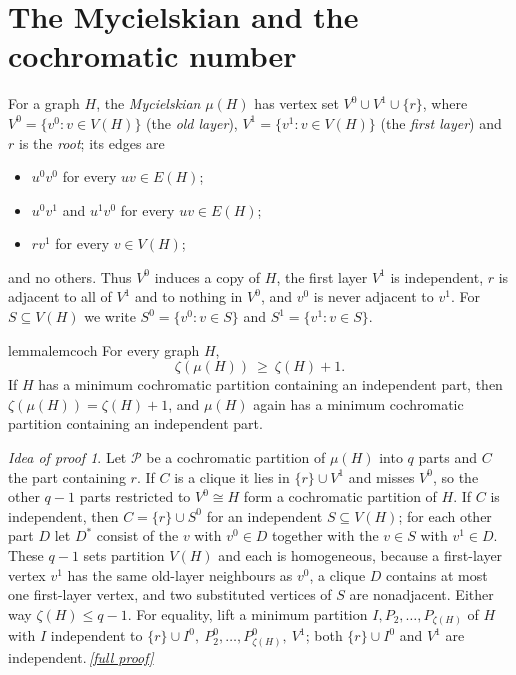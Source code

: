 \documentclass[11pt,a4paper]{article}
\theoremstyle{plain}
\theoremstyle{definition}
\theoremstyle{remark}
\newtheorem*{proofidea}{Idea of proof}
\newcommand{\fullproofref}[1]{\,\hyperref[#1]{\textit{[full proof]}}}
\newcommand{\myc}{\mu}
\newcommand{\cP}{\mathcal P}
\begin{document}
\section{The Mycielskian and the cochromatic number}\label{sec:myc}

For a graph $H$, the \emph{Mycielskian} $\myc(H)$ has vertex set $V^0\cup V^1\cup\{r\}$, where $V^0=\{v^0:v\in V(H)\}$ (the \emph{old layer}), $V^1=\{v^1:v\in V(H)\}$ (the \emph{first layer}) and $r$ is the \emph{root}; its edges are
\begin{itemize}[nosep]
\item $u^0v^0$ for every $uv\in E(H)$;
\item $u^0v^1$ and $u^1v^0$ for every $uv\in E(H)$;
\item $rv^1$ for every $v\in V(H)$;
\end{itemize}
and no others. Thus $V^0$ induces a copy of $H$, the first layer $V^1$ is independent, $r$ is adjacent to all of $V^1$ and to nothing in $V^0$, and $v^0$ is never adjacent to $v^1$. For $S\subseteq V(H)$ we write $S^0=\{v^0:v\in S\}$ and $S^1=\{v^1:v\in S\}$.

\begin{restatable}{lemma}{lemcoch}\label{lem:coch}
For every graph $H$,
\[
\zeta(\myc(H))\ \ge\ \zeta(H)+1 .
\]
If $H$ has a minimum cochromatic partition containing an independent part, then $\zeta(\myc(H))=\zeta(H)+1$, and $\myc(H)$ again has a minimum cochromatic partition containing an independent part.
\end{restatable}
\begin{proofidea}
Let $\cP$ be a cochromatic partition of $\myc(H)$ into $q$ parts and $C$ the part containing $r$. If $C$ is a clique it lies in $\{r\}\cup V^1$ and misses $V^0$, so the other $q-1$ parts restricted to $V^0\cong H$ form a cochromatic partition of $H$. If $C$ is independent, then $C=\{r\}\cup S^0$ for an independent $S\subseteq V(H)$; for each other part $D$ let $D^*$ consist of the $v$ with $v^0\in D$ together with the $v\in S$ with $v^1\in D$. These $q-1$ sets partition $V(H)$ and each is homogeneous, because a first-layer vertex $v^1$ has the same old-layer neighbours as $v^0$, a clique $D$ contains at most one first-layer vertex, and two substituted vertices of $S$ are nonadjacent. Either way $\zeta(H)\le q-1$. For equality, lift a minimum partition $I,P_2,\dots,P_{\zeta(H)}$ of $H$ with $I$ independent to $\{r\}\cup I^0,\ P_2^0,\dots,P_{\zeta(H)}^0,\ V^1$; both $\{r\}\cup I^0$ and $V^1$ are independent.\fullproofref{pf:coch}
\end{proofidea}
\end{document}
